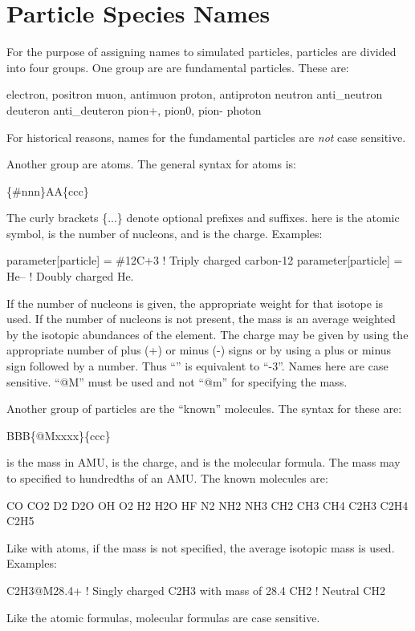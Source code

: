 {{{{{\section{Particle Species Names}
\label{s:species.name}

For the purpose of assigning names to simulated particles, particles are divided into four
groups. One group are are fundamental particles. These are:
\begin{example}
  electron,  positron
  muon,      antimuon
  proton,    antiproton
  neutron    anti_neutron
  deuteron   anti_deuteron
  pion+,     pion0,      pion-
  photon
\end{example}
For historical reasons, names for the fundamental particles are {\em not} case sensitive.

Another group are atoms. The general syntax for atoms is:
\begin{example}
  \{\#nnn\}AA\{ccc\}
\end{example}
The curly brackets \{...\} denote optional prefixes and suffixes.  here is the
atomic symbol,  is the number of nucleons, and  is the charge. Examples:
\begin{example}
  parameter[particle] = \#12C+3       ! Triply charged carbon-12
  parameter[particle] = He--          ! Doubly charged He.
\end{example}
If the number of nucleons is given, the appropriate weight for that isotope is used. If the number
of nucleons is not present, the mass is an average weighted by the isotopic abundances of the
element. The charge may be given by using the appropriate number of plus (+) or minus (-) signs or
by using a plus or minus sign followed by a number. Thus ``\vn{-{-}-}'' is equivalent to
``-3''. Names here are case sensitive. ``@M'' must be used and not ``@m'' for specifying the mass.

Another group of particles are the ``known'' molecules. The syntax for these are:
\begin{example}
  BBB\{@Mxxxx\}\{ccc\}
\end{example}
 is the mass in AMU,  is the charge, and  is the molecular formula. The
mass may to specified to hundredths of an AMU. The known molecules are:
\begin{example}
  CO       CO2      
  D2       D2O      
  OH       O2      
  H2       H2O      HF
  N2       NH2      NH3      
  CH2      CH3      CH4      
  C2H3     C2H4     C2H5
\end{example}
Like with atoms, if the mass is not specified, the average isotopic mass is used. Examples:
\begin{example}
  C2H3@M28.4+     ! Singly charged C2H3 with mass of 28.4
  CH2             ! Neutral CH2
\end{example}
Like the atomic formulas, molecular formulas are case sensitive.

}}}}}
